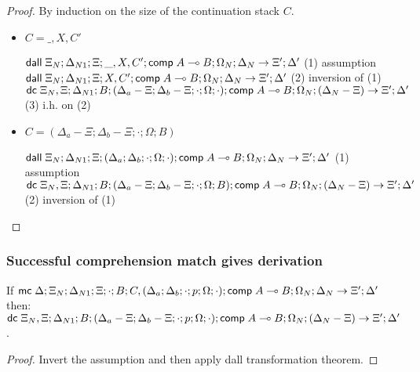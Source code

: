 \begin{proof}
   By induction on the size of the continuation stack $C$.
   
   \begin{itemize}
      \item $C = \_, X, C'$
      
      $\mathsf{dall} \; \Xi_N; \Delta_{N1}; \Xi; \_, X, C'; \mathsf{comp} \; A \multimap B; \Omega_N; \Delta_N \rightarrow \Xi'; \Delta'$ \hfill (1) assumption \\
      $\mathsf{dall} \; \Xi_N; \Delta_{N1}; \Xi; X, C'; \mathsf{comp} \; A \multimap B; \Omega_N; \Delta_N \rightarrow \Xi'; \Delta'$ \hfill (2) inversion of (1) \\
      $\mathsf{dc} \; \Xi_N, \Xi; \Delta_{N1}; B; (\Delta_a - \Xi; \Delta_b - \Xi; \cdot; \Omega; \cdot); \mathsf{comp} \; A \multimap B; \Omega_N; (\Delta_N - \Xi) \rightarrow \Xi'; \Delta'$ \hfill (3) i.h. on (2) \\
      
      \item $C = (\Delta_a - \Xi; \Delta_b - \Xi; \cdot; \Omega; B)$
      
      $\mathsf{dall} \; \Xi_N; \Delta_{N1}; \Xi; (\Delta_a; \Delta_b; \cdot; \Omega; \cdot); \mathsf{comp} \; A \multimap B; \Omega_N; \Delta_N \rightarrow \Xi'; \Delta'$ \hfill (1) assumption \\
      $\mathsf{dc} \; \Xi_N, \Xi; \Delta_{N1}; B; (\Delta_a - \Xi; \Delta_b - \Xi; \cdot; \Omega; B); \mathsf{comp} \; A \multimap B; \Omega_N; (\Delta_N - \Xi) \rightarrow \Xi'; \Delta'$ \hfill (2) inversion of (1) \\
   \end{itemize}
\end{proof}

\subsubsection{Successful comprehension match gives derivation}

If $\mathsf{mc} \; \Delta; \Xi_N; \Delta_{N1}; \Xi; \cdot; B; C, (\Delta_a; \Delta_b; \cdot; p; \Omega; \cdot); \mathsf{comp} \; A \multimap B; \Omega_N; \Delta_N \rightarrow \Xi'; \Delta'$ then:\\
\hspace{1cm} $\mathsf{dc} \; \Xi_N, \Xi; \Delta_{N1}; B; (\Delta_a - \Xi; \Delta_b - \Xi; \cdot; p; \Omega; \cdot); \mathsf{comp} \; A \multimap B; \Omega_N; (\Delta_N - \Xi) \rightarrow \Xi'; \Delta'$.

\begin{proof}
   Invert the assumption and then apply dall transformation theorem.
\end{proof}

